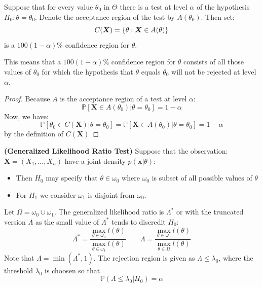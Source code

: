 \begin{theorem}
    Suppose that for every value $\theta_0$ in $\Theta$ there is a test at level $\alpha$ of the hypothesis $H_0 : \theta = \theta_0$. Denote the acceptance region of the test by $A(\theta_0)$. Then set:
    \begin{equation*}
        C(\boldsymbol X) = \left\{ \theta :\boldsymbol X \in A(\theta) \right\}
    \end{equation*}
    is a $100(1-\alpha)\%$ confidence region for $\theta$. 
\end{theorem}
\begin{remark}
    This means that a $100(1-\alpha)\%$ confidence region for $\theta$ consists of all those values of $\theta_0$ for which the hypothesis that $\theta$ equals $\theta_0$ will not be rejected at level $\alpha$.
\end{remark}
\begin{proof}
    Because $A$ is the acceptance region of a test at level $\alpha$:
    \begin{equation*}
        \mathbb{P}[\boldsymbol X \in A(\theta_0) | \theta = \theta_0] = 1-\alpha 
    \end{equation*}
    Now, we have:
    \begin{equation*}
        \mathbb{P}[\theta_0 \in C(\boldsymbol X) | \theta = \theta_0] = \mathbb{P}[\boldsymbol X \in A(\theta_0) | \theta=\theta_0] = 1-\alpha
    \end{equation*}
    by the definition of $C(\boldsymbol X)$
\end{proof}

\begin{definition}{\textbf{(Generalized Likelihood Ratio Test)}}
    Suppose that the observation: $\boldsymbol X = (X_1,\dots,X_n)$  have a joint density $p(\boldsymbol x | \theta)$:
    \begin{itemize}
        \item Then $H_0$ may specify that $\theta \in \omega_0$ where $\omega_0$ is subset of all possible values of $\theta$
        \item For $H_1$ we consider $\omega_1$ is disjoint from $\omega_0$. 
    \end{itemize}
    Let $\Omega = \omega_0 \cup \omega_1$. The generalized likelihood ratio is $\Lambda^*$ or with the truncated version $\Lambda$ as the small value of $\Lambda^*$ tends to discredit $H_0$: 
    \begin{equation*}
        \Lambda^* = \frac{\max_{\theta\in \omega_0} l(\theta)}{\max_{\theta \in \omega_1}l(\theta)}
        \qquad\Lambda = \frac{\max_{\theta \in \omega_0}l(\theta)}{\max_{\theta \in \Omega}l(\theta)}
    \end{equation*} 
    Note that $\Lambda = \min(\Lambda^*, 1)$. The rejection region is given as $\Lambda \le \lambda_0$, where the threshold $\lambda_0$ is choosen so that 
    \begin{equation*}
        \mathbb{P}(\Lambda \le \lambda_0 | H_0) = \alpha
    \end{equation*}
\end{definition}

